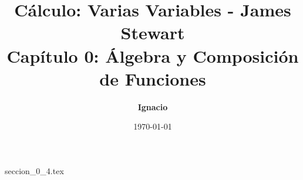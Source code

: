 \documentclass[11pt,spanish,oneside]{report}
\title{\textbf{Cálculo: Varias Variables - James Stewart} \\ \Large Capítulo 0: Álgebra y Composición de Funciones}
\author{\textbf{Ignacio}}
\date{\today}
\begin{document}
\maketitle

{seccion_0_4.tex}
\end{document}
